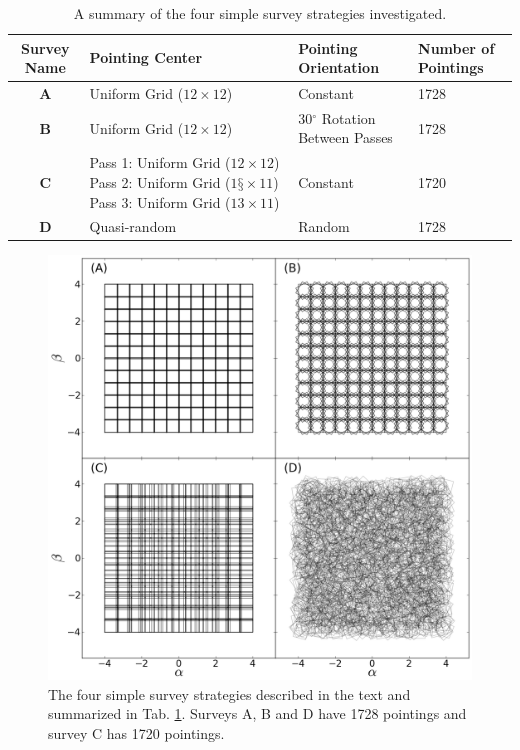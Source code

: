 \documentclass[manuscript]{aastex}
\begin{document}
\begin{table}
\begin{tabular}{|c|p{5.5cm}|p{3cm}|p{3cm}|}
\hline \textbf{Survey Name} & \textbf{Pointing Center} & \textbf{Pointing Orientation} & \textbf{Number of Pointings}\\ 
\hline \textbf{A} & Uniform Grid ($12\times12$) & Constant & 1728\\ 
\hline \textbf{B} & Uniform Grid ($12\times12$) & 30$^\circ$ Rotation Between Passes & 1728 \\ 
\hline \textbf{C} & Pass 1:  Uniform Grid ($12\times12$) Pass 2:  Uniform Grid ($1§\times11$) Pass 3:  Uniform Grid ($13\times11$)& Constant & 1720 \\ 
\hline \textbf{D} & Quasi-random & Random & 1728 \\ 
\hline 
\end{tabular}   
\caption{A summary of the four simple survey strategies investigated.\label{tab:surveys}}
\end{table}

\begin{figure}[ht]
\begin{center}
\includegraphics[width=\textwidth]{simple_surveys.png}
\end{center}
\caption{The four simple survey strategies described in the text and summarized in Tab. \ref{tab:surveys}. Surveys A, B and D have 1728 pointings and survey C has 1720 pointings.\label{fig:surveys}}
\end{figure}
\end{document}
